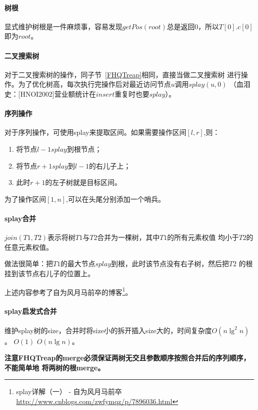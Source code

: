 \paragraph{树根}

显式维护树根是一件麻烦事，容易发现$getPos(root)$总是返回0，所以$T[0].c[0]$
即为$root$。

\paragraph{二叉搜索树}

对于二叉搜索树的操作，同子节~\ref{FHQTreap}相同，直接当做二叉搜索树
进行操作。为了优化树高，每次执行完操作后对最近访问节点$u$调用$splay(u,0)$
（血泪史：[HNOI2002]营业额统计在$insert$重复时也要$splay$）。

\paragraph{序列操作}

对于序列操作，可使用splay来提取区间。如果需要操作区间$[l,r]$,则：

\begin{enumerate}
	\item 将节点$l-1 splay$到根节点；
	\item 将节点$r+1 splay$到$l-1$的右儿子上；
	\item 此时$r+1$的左子树就是目标区间。
\end{enumerate}

为了操作区间$[1,n]$,可以在头尾分别添加一个哨兵。

\paragraph{splay合并}

$join(T1,T2)$表示将树$T1$与$T2$合并为一棵树，其中$T1$的所有元素权值
均小于$T2$的任意元素权值。

做法很简单：把$T1$的最大节点$splay$到根，此时该节点没有右子树，然后把$T2$
的根挂到该节点右儿子的位置上。

上述内容参考了自为风月马前卒的博客\footnote{splay详解（一） - 自为风月马前卒
	\url{http://www.cnblogs.com/zwfymqz/p/7896036.html}}。

\paragraph{splay启发式合并}
维护splay树的size，合并时将size小的拆开插入size大的，时间复杂度$O(n\lg^2n)$。
$O(1)$
$O(n\lg n)$。

{\bfseries 注意FHQTreap的merge必须保证两树无交且参数顺序按照合并后的序列顺序，不能简单地
将两树的根merge。}
